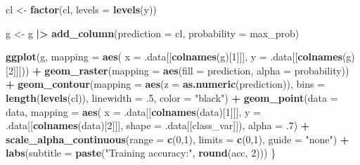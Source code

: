 \documentclass[
  notitlepage]{book}
\newenvironment{Shaded}{\begin{snugshade}}{\end{snugshade}}
\newcommand{\DataTypeTok}[1]{\textcolor[rgb]{0.13,0.29,0.53}{#1}}
\newcommand{\DecValTok}[1]{\textcolor[rgb]{0.00,0.00,0.81}{#1}}
\newcommand{\ErrorTok}[1]{\textcolor[rgb]{0.64,0.00,0.00}{\textbf{#1}}}
\newcommand{\FloatTok}[1]{\textcolor[rgb]{0.00,0.00,0.81}{#1}}
\newcommand{\KeywordTok}[1]{\textcolor[rgb]{0.13,0.29,0.53}{\textbf{#1}}}
\newcommand{\NormalTok}[1]{#1}
\newcommand{\OperatorTok}[1]{\textcolor[rgb]{0.81,0.36,0.00}{\textbf{#1}}}
\newcommand{\StringTok}[1]{\textcolor[rgb]{0.31,0.60,0.02}{#1}}
\begin{document}
\begin{Shaded}
\begin{Highlighting}[]
\NormalTok{  cl \textless{}{-}}\StringTok{ }\KeywordTok{factor}\NormalTok{(cl, }\DataTypeTok{levels =} \KeywordTok{levels}\NormalTok{(y))}
  
\NormalTok{  g \textless{}{-}}\StringTok{ }\NormalTok{g }\OperatorTok{|}\ErrorTok{\textgreater{}}\StringTok{ }\KeywordTok{add\_column}\NormalTok{(}\DataTypeTok{prediction =}\NormalTok{ cl, }
                       \DataTypeTok{probability =}\NormalTok{ max\_prob)}
  
  \KeywordTok{ggplot}\NormalTok{(g, }\DataTypeTok{mapping =} \KeywordTok{aes}\NormalTok{(}
    \DataTypeTok{x =}\NormalTok{ .data[[}\KeywordTok{colnames}\NormalTok{(g)[}\DecValTok{1}\NormalTok{]]], }
    \DataTypeTok{y =}\NormalTok{ .data[[}\KeywordTok{colnames}\NormalTok{(g)[}\DecValTok{2}\NormalTok{]]])) }\OperatorTok{+}
\StringTok{    }\KeywordTok{geom\_raster}\NormalTok{(}\DataTypeTok{mapping =} \KeywordTok{aes}\NormalTok{(}\DataTypeTok{fill =}\NormalTok{ prediction, }
                              \DataTypeTok{alpha =}\NormalTok{ probability)) }\OperatorTok{+}
\StringTok{    }\KeywordTok{geom\_contour}\NormalTok{(}\DataTypeTok{mapping =} \KeywordTok{aes}\NormalTok{(}\DataTypeTok{z =} \KeywordTok{as.numeric}\NormalTok{(prediction)), }
      \DataTypeTok{bins =} \KeywordTok{length}\NormalTok{(}\KeywordTok{levels}\NormalTok{(cl)), }
      \DataTypeTok{linewidth =} \FloatTok{.5}\NormalTok{, }
      \DataTypeTok{color =} \StringTok{"black"}\NormalTok{) }\OperatorTok{+}
\StringTok{    }\KeywordTok{geom\_point}\NormalTok{(}\DataTypeTok{data =}\NormalTok{ data, }\DataTypeTok{mapping =}  \KeywordTok{aes}\NormalTok{(}
      \DataTypeTok{x =}\NormalTok{ .data[[}\KeywordTok{colnames}\NormalTok{(data)[}\DecValTok{1}\NormalTok{]]], }
      \DataTypeTok{y =}\NormalTok{ .data[[}\KeywordTok{colnames}\NormalTok{(data)[}\DecValTok{2}\NormalTok{]]],}
      \DataTypeTok{shape =}\NormalTok{ .data[[class\_var]]), }
      \DataTypeTok{alpha =} \FloatTok{.7}\NormalTok{) }\OperatorTok{+}\StringTok{ }
\StringTok{    }\KeywordTok{scale\_alpha\_continuous}\NormalTok{(}\DataTypeTok{range =} \KeywordTok{c}\NormalTok{(}\DecValTok{0}\NormalTok{,}\DecValTok{1}\NormalTok{), }
                           \DataTypeTok{limits =} \KeywordTok{c}\NormalTok{(}\DecValTok{0}\NormalTok{,}\DecValTok{1}\NormalTok{), }
                           \DataTypeTok{guide =} \StringTok{"none"}\NormalTok{) }\OperatorTok{+}\StringTok{  }
\StringTok{    }\KeywordTok{labs}\NormalTok{(}\DataTypeTok{subtitle =} \KeywordTok{paste}\NormalTok{(}\StringTok{"Training accuracy:"}\NormalTok{, }\KeywordTok{round}\NormalTok{(acc, }\DecValTok{2}\NormalTok{)))}
\NormalTok{\}}
\end{Highlighting}
\end{Shaded}
\end{document}
